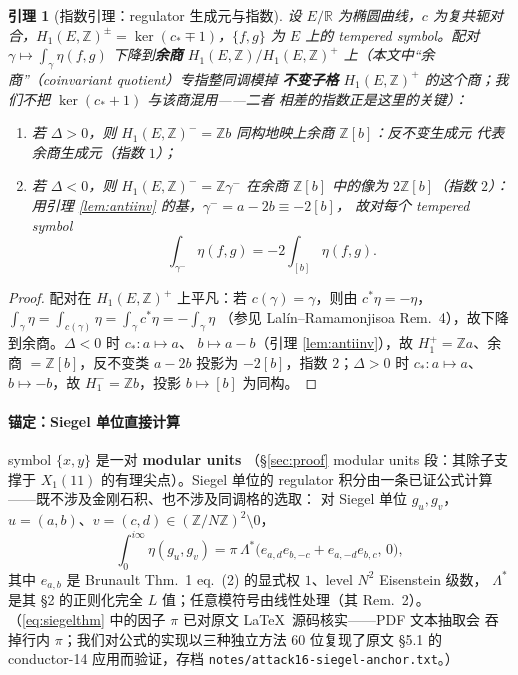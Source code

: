 \documentclass[11pt,a4paper]{ctexart}
\newtheorem{lemma}[theorem]{引理}
\theoremstyle{remark}
\newcommand{\ZZ}{\mathbb{Z}}
\newcommand{\RR}{\mathbb{R}}
\begin{document}
\begin{lemma}[指数引理：regulator 生成元与指数]\label{lem:coinvariant}
设 $E/\RR$ 为椭圆曲线，$c$ 为复共轭对合，$H_1(E,\ZZ)^\pm=\ker(c_*\mp1)$，$\{f,g\}$ 为
$E$ 上的 tempered symbol。配对 $\gamma\mapsto\int_\gamma\eta(f,g)$ 下降到\textbf{余商}
$H_1(E,\ZZ)/H_1(E,\ZZ)^+$ 上（本文中``余商''（coinvariant quotient）专指整同调模掉
\textbf{不变子格} $H_1(E,\ZZ)^+$ 的这个商；我们不把 $\ker(c_*+1)$ 与该商混用——二者
相差的指数正是这里的关键）：
\begin{enumerate}[nosep]
  \item 若 $\Delta>0$，则 $H_1(E,\ZZ)^-=\ZZ b$ 同构地映上余商 $\ZZ[b]$：反不变生成元
  代表余商生成元（指数 $1$）；
  \item 若 $\Delta<0$，则 $H_1(E,\ZZ)^-=\ZZ\gamma^-$ 在余商 $\ZZ[b]$ 中的像为
  $2\ZZ[b]$（指数 $2$）：用引理 \ref{lem:antiinv} 的基，$\gamma^-=a-2b\equiv-2[b]$，
  故对每个 tempered symbol
  \[
    \int_{\gamma^-}\eta(f,g)=-2\int_{[b]}\eta(f,g).
  \]
\end{enumerate}
\end{lemma}

\begin{proof}
配对在 $H_1(E,\ZZ)^+$ 上平凡：若 $c(\gamma)=\gamma$，则由 $c^*\eta=-\eta$，
$\int_\gamma\eta=\int_{c(\gamma)}\eta=\int_\gamma c^*\eta=-\int_\gamma\eta$
（参见 Lal\'in--Ramamonjisoa Rem.~4），故下降到余商。$\Delta<0$ 时 $c_*:a\mapsto a$、
$b\mapsto a-b$（引理 \ref{lem:antiinv}），故 $H_1^+=\ZZ a$、余商 $=\ZZ[b]$，反不变类
$a-2b$ 投影为 $-2[b]$，指数 $2$；$\Delta>0$ 时 $c_*:a\mapsto a$、$b\mapsto-b$，故
$H_1^-=\ZZ b$，投影 $b\mapsto[b]$ 为同构。
\end{proof}

\paragraph{锚定：Siegel 单位直接计算}symbol $\{x,y\}$ 是一对 \textbf{modular units}
（\S\ref{sec:proof} modular units 段：其除子支撑于 $X_1(11)$ 的有理尖点）。Siegel
单位的 regulator 积分由一条已证公式计算——既不涉及金刚石积、也不涉及同调格的选取：
对 Siegel 单位 $g_u,g_v$，$u=(a,b)$、$v=(c,d)\in(\ZZ/N\ZZ)^2\setminus0$，
\[
\int_0^{i\infty}\eta(g_u,g_v)
=\pi\,\Lambda^*\big(e_{a,d}e_{b,-c}+e_{a,-d}e_{b,c},\,0\big),\tag{S}\label{eq:siegelthm}
\]
其中 $e_{a,b}$ 是 Brunault Thm.~1 eq.~(2) 的显式权 $1$、level $N^2$ Eisenstein 级数，
$\Lambda^*$ 是其 \S2 的正则化完全 $L$ 值；任意模符号由线性处理（其 Rem.~2）。
（\eqref{eq:siegelthm} 中的因子 $\pi$ 已对原文 \LaTeX\ 源码核实——PDF 文本抽取会
吞掉行内 $\pi$；我们对公式的实现以三种独立方法 $60$ 位复现了原文 \S5.1 的
conductor-14 应用而验证，存档 \texttt{notes/attack16-siegel-anchor.txt}。）
\end{document}

